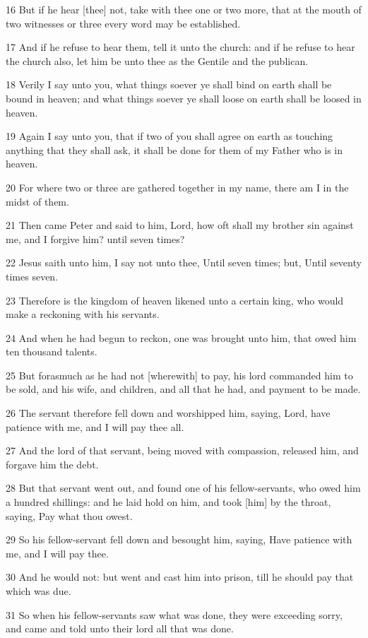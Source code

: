 \par 16 But if he hear [thee] not, take with thee one or two more, that at the mouth of two witnesses or three every word may be established.
\par 17 And if he refuse to hear them, tell it unto the church: and if he refuse to hear the church also, let him be unto thee as the Gentile and the publican.
\par 18 Verily I say unto you, what things soever ye shall bind on earth shall be bound in heaven; and what things soever ye shall loose on earth shall be loosed in heaven.
\par 19 Again I say unto you, that if two of you shall agree on earth as touching anything that they shall ask, it shall be done for them of my Father who is in heaven.
\par 20 For where two or three are gathered together in my name, there am I in the midst of them.
\par 21 Then came Peter and said to him, Lord, how oft shall my brother sin against me, and I forgive him? until seven times?
\par 22 Jesus saith unto him, I say not unto thee, Until seven times; but, Until seventy times seven.
\par 23 Therefore is the kingdom of heaven likened unto a certain king, who would make a reckoning with his servants.
\par 24 And when he had begun to reckon, one was brought unto him, that owed him ten thousand talents.
\par 25 But forasmuch as he had not [wherewith] to pay, his lord commanded him to be sold, and his wife, and children, and all that he had, and payment to be made.
\par 26 The servant therefore fell down and worshipped him, saying, Lord, have patience with me, and I will pay thee all.
\par 27 And the lord of that servant, being moved with compassion, released him, and forgave him the debt.
\par 28 But that servant went out, and found one of his fellow-servants, who owed him a hundred shillings: and he laid hold on him, and took [him] by the throat, saying, Pay what thou owest.
\par 29 So his fellow-servant fell down and besought him, saying, Have patience with me, and I will pay thee.
\par 30 And he would not: but went and cast him into prison, till he should pay that which was due.
\par 31 So when his fellow-servants saw what was done, they were exceeding sorry, and came and told unto their lord all that was done.
